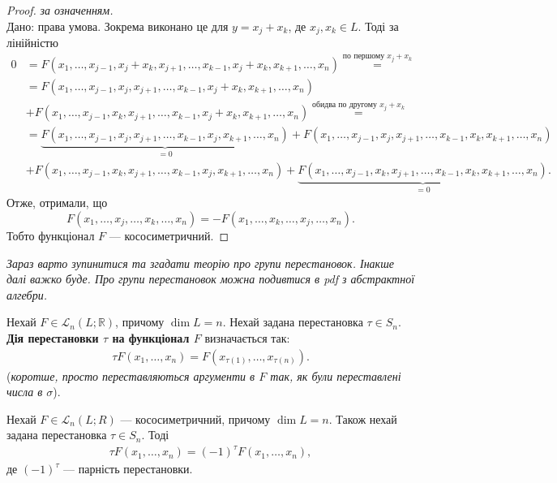 \documentclass{math_library}
\begin{document}
	\begin{proof}
	\rightproof \textit{за означенням.}\bigskip \\
	\leftproof Дано: права умова. Зокрема виконано це для $y = x_j + x_k$, де $x_j, x_k \in L$. Тоді за лінійністю
	\begin{align*}
	0 & = F(x_1,\dots, x_{j-1}, x_j+x_k ,x_{j+1}, \dots, x_{k-1}, x_j+x_k, x_{k+1}, \dots, x_n) \overset{\textrm{по першому } x_j+x_k}{=} \\ 
	& = F(x_1,\dots, x_{j-1}, x_j ,x_{j+1}, \dots, x_{k-1}, x_j+x_k, x_{k+1}, \dots, x_n) \\
	& + F(x_1,\dots, x_{j-1}, x_k ,x_{j+1}, \dots, x_{k-1}, x_j+x_k, x_{k+1}, \dots, x_n) \overset{\textrm{обидва по другому } x_j+x_k}{=} \\ 
	& = \underbrace{F(x_1,\dots, x_{j-1}, x_j ,x_{j+1}, \dots, x_{k-1}, x_j, x_{k+1}, \dots, x_n)}_{=0} + F(x_1,\dots, x_{j-1}, x_j ,x_{j+1}, \dots, x_{k-1}, x_k, x_{k+1}, \dots, x_n) \\ 
	& + F(x_1,\dots, x_{j-1}, x_k ,x_{j+1}, \dots, x_{k-1}, x_j, x_{k+1}, \dots, x_n) + \underbrace{F(x_1,\dots, x_{j-1}, x_k ,x_{j+1}, \dots, x_{k-1}, x_k, x_{k+1}, \dots, x_n)}_{=0}.
	\end{align*}
	Отже, отримали, що
	\[
	F(x_1,\dots, x_j, \dots, x_k, \dots, x_n) = -F(x_1,\dots, x_k, \dots, x_j, \dots, x_n).
	\]
	Тобто функціонал $F$ --- кососиметричний.
	\end{proof}
	\noindent
	\textit{Зараз варто зупинитися та згадати теорію про групи перестановок. Інакше далі важко буде. Про групи перестановок можна подивтися в pdf з абстрактної алгебри.}
	
	\begin{definition}
	Нехай $F \in \mathcal{L}_n(L;\mathbb{R})$, причому $\dim L = n$. Нехай задана перестановка $\tau \in S_n$.\\
\textbf{Дія перестановки $\tau$ на функціонал $F$} визначається так:
\begin{align*}
\tau F(x_1,\dots,x_n) = F(x_{\tau(1)},\dots,x_{\tau(n)}).
\end{align*}
	(\textit{коротше, просто переставляються аргументи в $F$ так, як були переставлені числа в $\sigma$}).
	\end{definition}
	
	\begin{lemma}
	\label{permutation_functional}
	Нехай $F \in \mathcal{L}_n(L;R)$ --- кососиметричний, причому $\dim L = n$. Також нехай задана перестановка $\tau \in S_n$. Тоді
	\begin{align*}
	\tau F(x_1,\dots, x_n) = (-1)^\tau F(x_1,\dots,x_n),
	\end{align*}
 	де $(-1)^\tau$ --- парність перестановки.
	\end{lemma}
	
\end{document}
